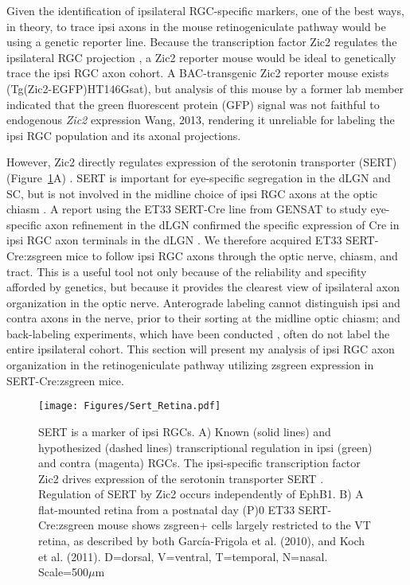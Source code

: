 \label{sec:SertCreResults}
Given the identification of ipsilateral RGC-specific markers, one of the best ways, in theory, to trace ipsi axons in the mouse retinogeniculate pathway would be using a genetic reporter line.
Because the transcription factor Zic2 regulates the ipsilateral RGC projection \cite{herrera2003zic2,williams2003ephrin}, a Zic2 reporter mouse would be ideal to genetically trace the ipsi RGC axon cohort.
A BAC-transgenic Zic2 reporter mouse exists (Tg(Zic2-EGFP)HT146Gsat), but analysis of this mouse by a former lab member indicated that the green fluorescent protein (GFP) signal was not faithful to endogenous \emph{Zic2} expression {Wang, 2013}, rendering it unreliable for labeling the ipsi RGC population and its axonal projections.

However, Zic2 directly regulates expression of the serotonin transporter (SERT) (Figure~\ref{Figures/Sert_Retina}A) \cite{garcia2010zic2}.
SERT is important for eye-specific segregation in the dLGN and SC, but is not involved in the midline choice of ipsi RGC axons at the optic chiasm \cite{salichon2001excessive,upton1999excess,garcia2010zic2}.
A report using the ET33 SERT-Cre line from GENSAT to study eye-specific axon refinement in the dLGN confirmed the specific expression of Cre in ipsi RGC axon terminals in the dLGN \cite{koch2011pathway}.
We therefore acquired ET33 SERT-Cre:zsgreen mice to follow ipsi RGC axons through the optic nerve, chiasm, and tract.
This is a useful tool not only because of the reliability and specifity afforded by genetics, but because it provides the clearest view of ipsilateral axon organization in the optic nerve.
Anterograde labeling cannot distinguish ipsi and contra axons in the nerve, prior to their sorting at the midline optic chiasm; and back-labeling experiments, which have been conducted \cite{colello1990early}, often do not label the entire ipsilateral cohort.
This section will present my analysis of ipsi RGC axon organization in the retinogeniculate pathway utilizing zsgreen expression in SERT-Cre:zsgreen mice.

\begin{figure}[hbtp]
	\begin{center}
		\texttt{[image: Figures/Sert\_Retina.pdf]}
		\caption[SERT is a marker of ipsi RGCs.]
		{SERT is a marker of ipsi RGCs. 
		A) Known (solid lines) and hypothesized (dashed lines) transcriptional regulation in ipsi (green) and contra (magenta) RGCs.
		The ipsi-specific transcription factor Zic2 drives expression of the serotonin transporter SERT \cite{garcia2010zic2}.
		Regulation of SERT by Zic2 occurs independently of EphB1.
		B) A flat-mounted retina from a postnatal day (P)0 ET33 SERT-Cre:zsgreen mouse shows zsgreen+ cells largely restricted to the VT retina, as described by both Garc\'ia-Frigola et al. (2010), and Koch et al. (2011). 
		D=dorsal, V=ventral, T=temporal, N=nasal. 
		Scale=500$\mu$m}
		\label{Figures/Sert_Retina}
	\end{center}
\end{figure}

